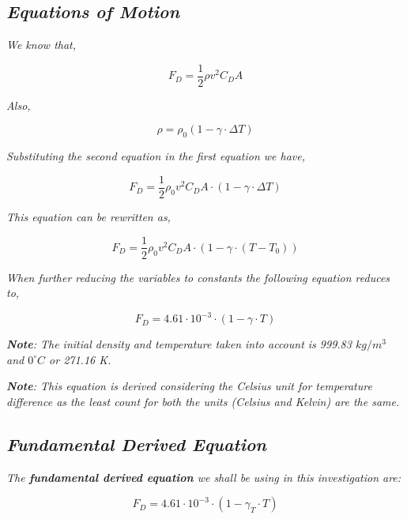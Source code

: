 
\subsection{\textit{Equations of Motion}}
            
   \textit{We know that,}
            
		$$F_D = \frac{1}{2}\rho v^2C_DA$$

	\textit{Also,}
		
		$$\rho = \rho_{0}\left(1 - \gamma\cdot\Delta T\right)$$

	\textit{Substituting the second equation in the first equation we have,}
	
		$$F_D = \frac{1}{2}\rho_{0}v^2C_DA\cdot\left(1 - \gamma\cdot\Delta T\right)$$

	\textit{This equation can be rewritten as,}

		$$F_D = \frac{1}{2}\rho_{0}v^2C_DA\cdot\left(1 - \gamma\cdot\left(T - T_{0}\right)\right)$$

	\textit{When further reducing the variables to constants the following equation reduces to,}

		$$F_D = 4.61\cdot 10^{-3}\cdot\left(1 - \gamma\cdot T\right)$$

	\textit{\textbf{Note}: The initial density and temperature taken into account is 999.83 $kg/m^3$ and ${0}^\circ C$ or 271.16 K.}

	\textit{\textbf{Note}: This equation is derived considering the Celsius unit for temperature difference as the least count for both the units (Celsius and Kelvin) are the same.}

\subsection{\textit{Fundamental Derived Equation}}

	\textit{The \textbf{fundamental derived equation} we shall be using in this investigation are:}
            
   	\begin{equation}
      	F_D = 4.61\cdot 10^{-3}\cdot\left(1 - \gamma_{T}\cdot T\right)
      	\label{eq1}
    	\end{equation}
            
            
            




